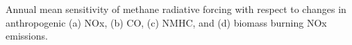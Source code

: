 Annual mean sensitivity of methane radiative forcing with respect to changes in anthropogenic (a) NOx, (b) CO, (c) NMHC, and (d) biomass burning NOx emissions.